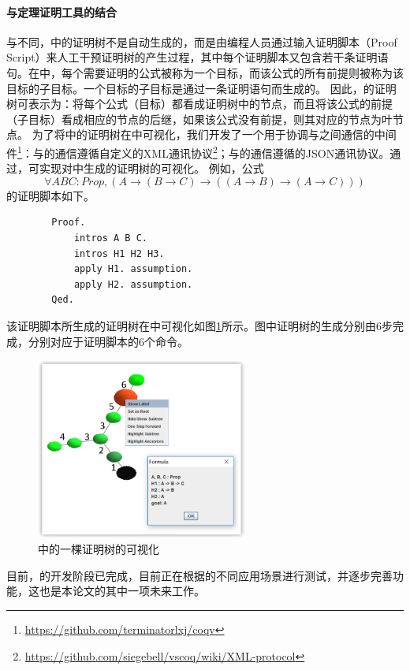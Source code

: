 \paragraph{与定理证明工具的结合}
与\sctlprov{}不同，中的证明树不是自动生成的，而是由编程人员通过输入证明脚本（Proof Script）来人工干预证明树的产生过程，其中每个证明脚本又包含若干条证明语句。在中，每个需要证明的公式被称为一个目标，而该公式的所有前提则被称为该目标的子目标。一个目标的子目标是通过一条证明语句而生成的。
因此，的证明树可表示为：将每个公式（目标）都看成证明树中的节点，而且将该公式的前提（子目标）看成相应的节点的后继，如果该公式没有前提，则其对应的节点为叶节点。
为了将中的证明树在中可视化，我们开发了一个用于协调与之间通信的中间件\footnote{\url{https://github.com/terminatorlxj/coqv}}：与的通信遵循自定义的XML通讯协议\footnote{\url{https://github.com/siegebell/vscoq/wiki/XML-protocol}}；与的通信遵循的JSON通讯协议。通过，可实现对中生成的证明树的可视化。
例如，公式$$\forall A B C: Prop, (A\rightarrow(B\rightarrow C)\rightarrow ((A\rightarrow B)\rightarrow(A\rightarrow C)))$$的证明脚本如下。
\begin{center}
		\begin{verbatim}
		Proof.
		    intros A B C.
		    intros H1 H2 H3.
		    apply H1. assumption.
		    apply H2. assumption.
		Qed.
		\end{verbatim}
	
\end{center}
该证明脚本所生成的证明树在中可视化如图\ref{vmdv:coq:vis}所示。图中证明树的生成分别由6步完成，分别对应于证明脚本的6个命令。
\begin{figure}[h!]
	\centering
	\includegraphics[width=7cm]{Img/coq_example.png}
	\caption{中的一棵证明树的可视化}
	\label{vmdv:coq:vis}
\end{figure}
目前，的开发阶段已完成，目前正在根据的不同应用场景进行测试，并逐步完善功能，这也是本论文的其中一项未来工作。

